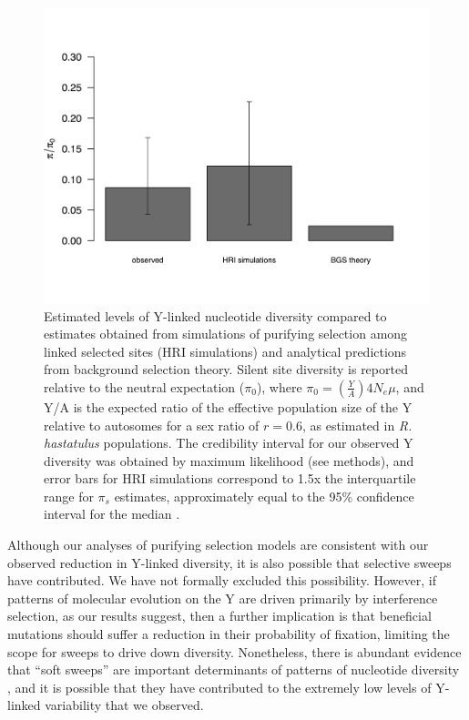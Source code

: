 \documentclass[9pt,twocolumn,twoside,lineno]{gsajnl}
\begin{document}
\begin{figure}[t!]
\centering
\noindent
\includegraphics[width=\linewidth]{figure4.jpg}
\caption{Estimated levels of Y-linked nucleotide diversity compared to estimates obtained from simulations of purifying selection among linked selected sites (HRI simulations) and analytical predictions from background selection theory. Silent site diversity is reported relative to the neutral expectation ($\pi_{0}$), where $\pi_{0}=(\frac{Y}{A})4N_{e}\mu$, and Y/A is the expected ratio of the effective population size of the Y relative to autosomes for a sex ratio of $r=0.6$, as estimated in \textit{R. hastatulus} populations. The credibility interval for our observed Y diversity was obtained by maximum likelihood (see methods), and error bars for HRI simulations correspond to 1.5x the interquartile range for $\pi_{s}$ estimates, approximately equal to the 95\% confidence interval for the median \citep{chambers1983graphical}.
}
\label{fig:ydiversity}
\end{figure}

Although our analyses of purifying selection models are consistent with our observed reduction in Y-linked diversity, it is also possible that selective sweeps have contributed. We have not formally excluded this possibility. However, if patterns of molecular evolution on the Y are driven primarily by interference selection, as our results suggest, then a further implication is that beneficial mutations should suffer a reduction in their probability of fixation, limiting the scope for sweeps to drive down diversity. Nonetheless, there is abundant evidence that “soft sweeps” are important determinants of patterns of nucleotide diversity \citep{messer2013population}, and it is possible that they have contributed to the extremely low levels of Y-linked variability that we observed.
\end{document}

